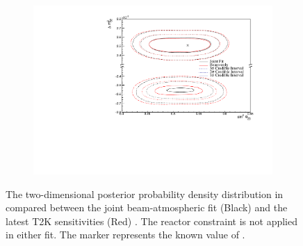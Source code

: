 \begin{figure}[h]
  \begin{subfigure}[t]{0.98\textwidth}
    \includegraphics[width=\textwidth, trim={0mm 0mm 0mm 0mm}, clip,page=1]{Figures/OA/JointFit_OA2020_Comp/ContourComparison_2D_th23_dm32_BH_1_woRC_UnSmeared_CredibleInterval.pdf}
  \end{subfigure}
  \caption{The two-dimensional posterior probability density distribution in  compared between the joint beam-atmospheric fit (Black) and the latest T2K sensitivities (Red) \cite{Dunne2020-uf, t2k_tn_393}. The reactor constraint is not applied in either fit. The marker represents the known value of .}
  \label{fig:OscillationAnalysis_JointFit_OA2020_DM32TH23}
\end{figure}

